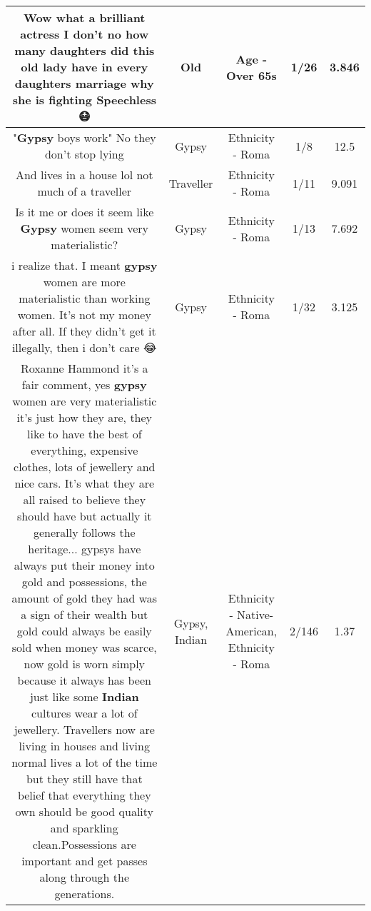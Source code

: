 \documentclass[11pt]{article}
\newlength\mylength
\begin{document}
\begin{center}
\begin{longtable}{|C{.65\mylength}|C{.30\mylength}|C{.12\mylength}|C{.12\mylength}|C{.12\mylength}|}
  \small Wow what a brilliant actress I don't no how many daughters did this \textbf{old} lady have in every daughters marriage why she is fighting Speechless 😷\normalsize   & Old & Age - Over 65s & 1/26 & 3.846 \\  \hline
  \small "\textbf{Gypsy} boys work" No they don't stop lying\normalsize   & Gypsy & Ethnicity - Roma & 1/8 & 12.5 \\  \hline
  \small And lives in a house lol not much of a traveller\normalsize   & Traveller & Ethnicity - Roma & 1/11 & 9.091 \\  \hline
  \small Is it me or does it seem like \textbf{Gypsy} women seem very materialistic?\normalsize   & Gypsy & Ethnicity - Roma & 1/13 & 7.692 \\  \hline
  \small {} i realize that. I meant  \textbf{gypsy} women are more materialistic than working women. It's not my money after all. If they didn't get it illegally, then i don't care 😂\normalsize   & Gypsy & Ethnicity - Roma & 1/32 & 3.125 \\  \hline
  \small Roxanne Hammond it's a fair comment, yes \textbf{gypsy} women are very materialistic it's just how they are, they like to have the best of everything, expensive clothes, lots of jewellery and nice cars. It's what they are all raised to believe they should have but actually it generally follows the heritage... gypsys have always put their money into gold and possessions, the amount of gold they had was a sign of their wealth but gold could always be easily sold when money was scarce, now gold is worn simply because it always has been just like some \textbf{Indian} cultures wear a lot of jewellery. Travellers now are living in houses and living normal lives a lot of the time but they still have that belief that everything they own should be good quality and sparkling clean.Possessions are important and get passes along through the generations.\normalsize   & Gypsy, Indian & Ethnicity - Native-American, Ethnicity - Roma & 2/146 & 1.37 \\  \hline

\end{longtable}
\end{center}
\end{document}
